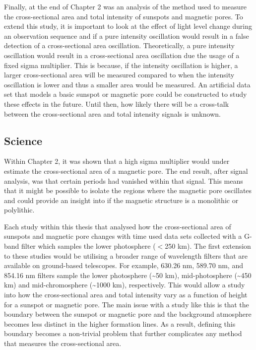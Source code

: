     Finally, at the end of Chapter 2 was an analysis of the method used to measure the cross-sectional area and total intensity of sunspots and magnetic pores.
    To extend this study, it is important to look at the effect of light level change during an observation sequence and if a pure intensity oscillation would result in a false detection of a cross-sectional area oscillation. 
    Theoretically, a pure intensity oscillation would result in a cross-sectional area oscillation due the usage of a fixed sigma multiplier.
    This is because, if the intensity oscillation is higher, a larger cross-sectional area will be measured compared to when the intensity oscillation is lower and thus a smaller area would be measured.
    An artificial data set that models a basic sunspot or magnetic pore could be constructed to study these effects in the future.  
    Until then, how likely there will be a cross-talk between the cross-sectional area and total intensity signals is unknown.
                
    \subsection{Science}
 
	Within Chapter 2, it was shown that a high sigma multiplier would under estimate the cross-sectional area of a magnetic pore.
	The end result, after signal analysis, was that certain periods had vanished within that signal.
	This means that it might be possible to isolate the regions where the magnetic pore oscillates and could provide an insight into if the magnetic structure is a monolithic or polylithic.
 
    Each study within this thesis that analysed how the cross-sectional area of sunspots and magnetic pore changes with time used data sets collected with a G-band filter which samples the lower photosphere ($<$250 km).
    The first extension to these studies would be utilising a broader range of wavelength filters that are available on ground-based telescopes.    
    For example,  630.26 nm,  589.70 nm, and  854.16 nm filters sample the lower photosphere (\textasciitilde50 km), mid-photosphere (\textasciitilde 450 km) and mid-chromosphere (\textasciitilde1000 km), respectively.
    This would allow a study into how the cross-sectional area and total intensity vary as a function of height for a sunspot or magnetic pore. 
    The main issue with a study like this is that the boundary between the sunspot or magnetic pore and the background atmosphere becomes less distinct in the higher formation lines.
    As a result, defining this boundary becomes a non-trivial problem that further complicates any method that measures the cross-sectional area.

